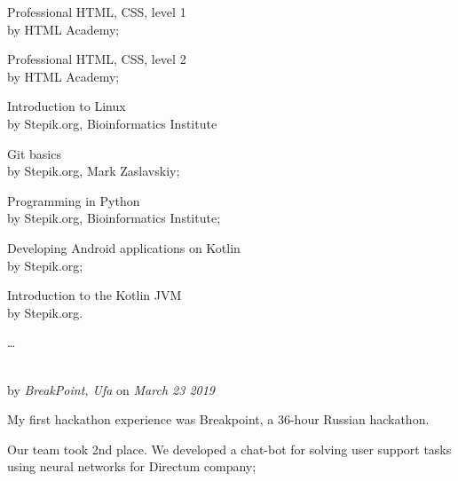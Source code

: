\begin{multicols}{2}
	\begin{compactitem}[\color{Cyan}$\circ$]
		\item\footnotesize Professional HTML, CSS, level 1 \\
		by \footnotesize{HTML Academy;}
		
		\item\footnotesize Professional HTML, CSS, level 2 \\
		by \footnotesize{HTML Academy;}
		
		\item\footnotesize Introduction to Linux \\
		by \footnotesize{Stepik.org, Bioinformatics Institute}
		
		\item\footnotesize Git basics \\
		by \footnotesize{Stepik.org, Mark Zaslavskiy;}
		\vfill\columnbreak
		
		\item\footnotesize Programming in Python \\
		by \footnotesize{Stepik.org, Bioinformatics Institute;}
		
		\item\footnotesize Developing Android applications on Kotlin \\
		by \footnotesize{Stepik.org;}
		
		\item\footnotesize Introduction to the Kotlin JVM \\
		by \footnotesize{Stepik.org.}
		
		\item \ldots
		
	\end{compactitem}
\end{multicols}

\Sep




 \\
by \textit{BreakPoint, Ufa}
on \textit{March 23 2019}
\SmallSep

\footnotesize My first hackathon experience was Breakpoint, a 36-hour Russian hackathon.

\footnotesize Our team took 2nd place. We developed a chat-bot for solving user support tasks using neural networks for Directum company;
\SmallSep

